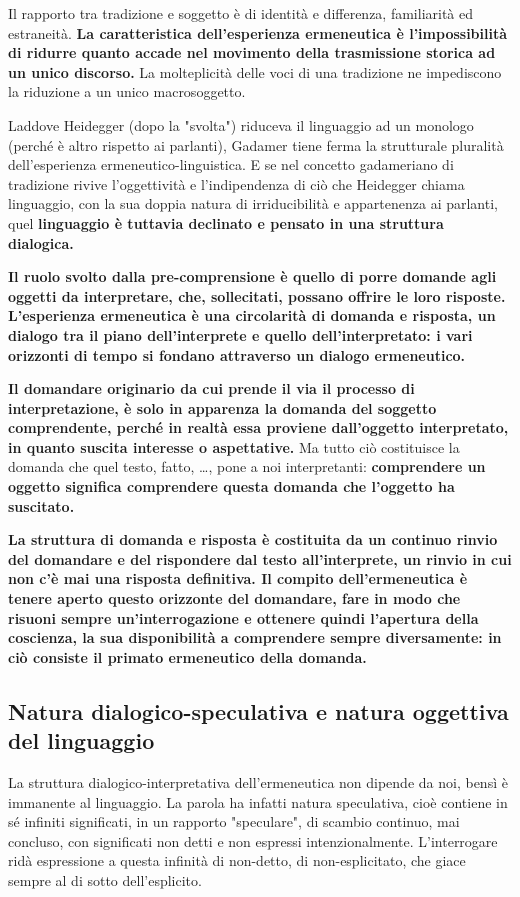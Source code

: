 Il rapporto tra tradizione e soggetto è di identità e differenza, familiarità ed estraneità. \textbf{La caratteristica dell'esperienza ermeneutica è l'impossibilità di ridurre quanto accade nel movimento della trasmissione storica ad un unico discorso.} La molteplicità delle voci di una tradizione ne impediscono la riduzione a un unico macrosoggetto.

Laddove Heidegger (dopo la "svolta") riduceva il linguaggio ad un monologo (perché è altro rispetto ai parlanti), Gadamer tiene ferma la strutturale pluralità dell'esperienza ermeneutico-linguistica. E se nel concetto gadameriano di tradizione rivive l'oggettività e l'indipendenza di ciò che Heidegger chiama linguaggio, con la sua doppia natura di irriducibilità e appartenenza ai parlanti, quel \textbf{linguaggio è tuttavia declinato e pensato in una struttura dialogica.}

\textbf{Il ruolo svolto dalla pre-comprensione è quello di porre domande  agli oggetti da interpretare, che, sollecitati, possano offrire le loro risposte. L'esperienza ermeneutica è una circolarità di domanda e risposta, un dialogo tra il piano dell'interprete e quello dell'interpretato: i vari orizzonti di tempo si fondano attraverso un dialogo ermeneutico.}

\textbf{Il domandare originario da cui prende il via il processo di interpretazione, è solo in apparenza la domanda del soggetto comprendente, perché in realtà essa proviene dall'oggetto interpretato, in quanto suscita interesse o aspettative.} Ma tutto ciò costituisce la domanda che quel testo, fatto, \dots, pone a noi interpretanti: \textbf{comprendere un oggetto significa comprendere questa domanda che l'oggetto ha suscitato.}

\textbf{La struttura di domanda e risposta è costituita da un continuo rinvio del domandare e del rispondere dal testo all'interprete, un rinvio in cui non c'è mai una risposta definitiva. Il compito dell'ermeneutica è tenere aperto questo orizzonte del domandare, fare in modo che risuoni sempre un'interrogazione e ottenere quindi l'apertura della coscienza, la sua disponibilità a comprendere sempre diversamente: in ciò consiste il primato ermeneutico della domanda.}

\subsection{Natura dialogico-speculativa e natura oggettiva del linguaggio}

La struttura dialogico-interpretativa dell'ermeneutica non dipende da noi, bensì è immanente al linguaggio. La parola ha infatti natura speculativa, cioè contiene in sé infiniti significati, in un rapporto "speculare", di scambio continuo, mai concluso, con significati non detti e non espressi intenzionalmente. L'interrogare  ridà espressione a questa infinità di non-detto, di non-esplicitato, che giace sempre al di sotto dell'esplicito.

